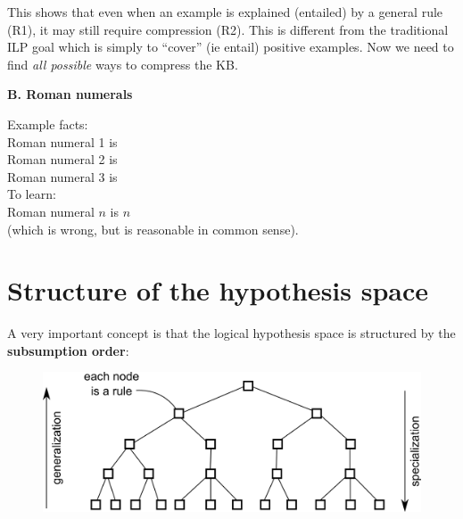 This shows that even when an example is explained (entailed) by a general rule (R1), it may still require compression (R2).  This is different from the traditional ILP goal which is simply to ``cover'' (ie entail) positive examples.  Now we need to find \textit{all possible} ways to compress the KB.

\textbf{B. Roman numerals}

Example facts:\\
\hspace*{1cm} Roman numeral 1 is \\
\hspace*{1cm} Roman numeral 2 is \\
\hspace*{1cm} Roman numeral 3 is \\
To learn:\\
\hspace*{1cm} Roman numeral $n$ is $n$ \\
(which is wrong, but is reasonable in common sense).

\section{Structure of the hypothesis space}
\label{sec:subsumption-peaking}

A very important concept is that the logical hypothesis space is structured by the \textbf{subsumption order}:
\begin{figure}[H]
\centering
\includegraphics[scale=1]{rules-tree.png}
\end{figure}

